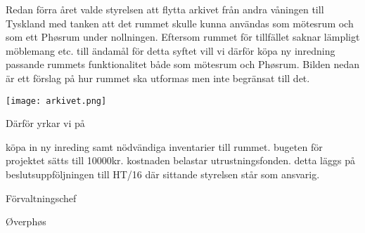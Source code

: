 \documentclass[../_main/handlingar.tex]{subfiles}
\begin{document}
Redan förra året valde styrelsen att flytta arkivet från andra våningen till Tyskland med tanken att det rummet skulle kunna användas som mötesrum och som ett Phøsrum under nollningen. Eftersom rummet för tillfället saknar lämpligt möblemang etc. till ändamål för detta syftet vill vi därför köpa ny inredning passande rummets funktionalitet både som mötesrum och Phøsrum. Bilden nedan är ett förslag på hur rummet ska utformas men inte begränsat till det.

\begin{center}
\texttt{[image: arkivet.png]}
\end{center}

Därför yrkar vi på
\begin{attsatser}
    \att köpa in ny inreding samt nödvändiga inventarier till rummet.
    \att bugeten för projektet sätts till 10000kr.
    \att kostnaden belastar utrustningsfonden.
    \att detta läggs på beslutsuppföljningen till HT/16 där sittande styrelsen står som ansvarig.
\end{attsatser}

\begin{signatures}{2}
    \ist
    \signature{Anders Nilsson}{Förvaltningschef}
    \signature{Molly Rusk}{Øverphøs}
\end{signatures}
\end{document}
